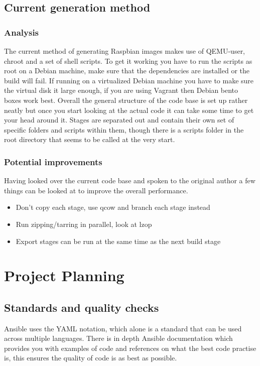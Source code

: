 \documentclass[12pt,a4paper]{report}
\begin{document}
\section{Current generation method}
\subsection{Analysis}
The current method of generating Raspbian images makes use of QEMU-user, chroot and a set of shell scripts. To get it working you have to run the scripts as root on a Debian machine, make sure that the dependencies are installed or the build will fail. If running on a virtualized Debian machine you have to make sure the virtual disk it large enough, if you are using Vagrant then Debian bento boxes \citep{bento} work best. Overall the general structure of the code base is set up rather neatly but once you start looking at the actual code it can take some time to get your head around it. Stages are separated out and contain their own set of specific folders and scripts within them, though there is a scripts folder in the root directory that seems to be called at the very start.  
\subsection{Potential improvements}
Having looked over the current code base and spoken to the original author a few things can be looked at to improve the overall performance.
\begin{itemize}
  \item{Don't copy each stage, use qcow and branch each stage instead}
  \item{Run zipping/tarring in parallel, look at lzop}
  \item{Export stages can be run at the same time as the next build stage}
\end{itemize}


\chapter{Project Planning}
\section{Standards and quality checks}
Ansible uses the YAML notation, which alone is a standard that can be used across multiple languages. There is in depth Ansible documentation \citep{ansibledoc} which provides you with examples of code and references on what the best code practise is, this ensures the quality of code is as best as possible.
\end{document}
